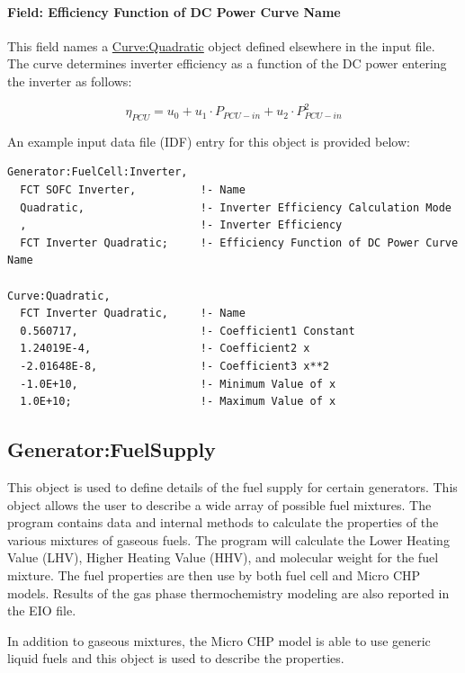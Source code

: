 \paragraph{Field: Efficiency Function of DC Power Curve Name}\label{field-efficiency-function-of-dc-power-curve-name}

This field names a \hyperref[curvequadratic]{Curve:Quadratic} object defined elsewhere in the input file. The curve determines inverter efficiency as a function of the DC power entering the inverter as follows:

\begin{equation}
{\eta_{PCU}} = {u_0} + {u_1} \cdot {P_{PCU - in}} + {u_2} \cdot P_{PCU - in}^2
\end{equation}

An example input data file (IDF) entry for this object is provided below:

\begin{lstlisting}
Generator:FuelCell:Inverter,
  FCT SOFC Inverter,          !- Name
  Quadratic,                  !- Inverter Efficiency Calculation Mode
  ,                           !- Inverter Efficiency
  FCT Inverter Quadratic;     !- Efficiency Function of DC Power Curve Name

Curve:Quadratic,
  FCT Inverter Quadratic,     !- Name
  0.560717,                   !- Coefficient1 Constant
  1.24019E-4,                 !- Coefficient2 x
  -2.01648E-8,                !- Coefficient3 x**2
  -1.0E+10,                   !- Minimum Value of x
  1.0E+10;                    !- Maximum Value of x
\end{lstlisting}

\subsection{Generator:FuelSupply}\label{generatorfuelsupply}

This object is used to define details of the fuel supply for certain generators. This object allows the user to describe a wide array of possible fuel mixtures. The program contains data and internal methods to calculate the properties of the various mixtures of gaseous fuels. The program will calculate the Lower Heating Value (LHV), Higher Heating Value (HHV), and molecular weight for the fuel mixture. The fuel properties are then use by both fuel cell and Micro CHP models. Results of the gas phase thermochemistry modeling are also reported in the EIO file.

In addition to gaseous mixtures, the Micro CHP model is able to use generic liquid fuels and this object is used to describe the properties.


